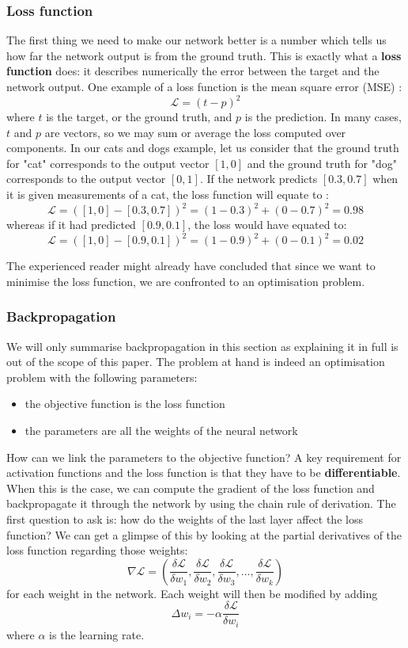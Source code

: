 \subsubsection{Loss function}
The first thing we need to make our network better is a number which tells us
how far the network output is from the ground truth.
This is exactly what a \textbf{loss function}  does: 
it describes numerically the error between the target and the network output.
One example of a loss function is the mean square error (MSE) :
$$ \mathcal{L} = (t-p)^2$$
where $t$ is the target, or the ground truth, and $p$ is the prediction. In
many cases, $t$ and $p$ are vectors, so we may sum or average the loss computed
over components.
In our cats and dogs example, let us consider that the ground truth for
"cat" corresponds to the output vector $[1, 0]$ and the ground truth for "dog"
corresponds to the output vector $[0, 1]$. If the network predicts $[0.3, 0.7]$
when it is given measurements of a cat, the loss function will equate to :
$$ \mathcal{L} = ([1, 0]-[0.3, 0.7])^2 = (1-0.3)^2 + (0-0.7)^2 = 0.98$$
whereas if it had predicted $[0.9, 0.1]$, the loss would have equated to:
$$ \mathcal{L} = ([1, 0]-[0.9, 0.1])^2 = (1-0.9)^2 + (0-0.1)^2 = 0.02$$

The experienced reader might already have concluded that since we want to
minimise the loss function, we are confronted to an optimisation problem.

\subsubsection{Backpropagation}
We will only summarise backpropagation in this section as explaining it in
full is out of the scope of this paper.
The problem at hand is indeed an optimisation problem with the following
parameters:
\begin{itemize}
	\item the objective function is the loss function
	\item the parameters are all the weights of the neural network
\end{itemize}
How can we link the parameters to the objective function? A key requirement
for activation functions and the loss function is that they have to be
\textbf{differentiable}. When this is the case, we can compute the gradient
of the loss function and backpropagate it through the network by using the
chain rule of derivation. The first question to ask is: how do the weights
of the last layer affect the loss function? We can get a glimpse of this
by looking at the partial derivatives of the loss function regarding those
weights:
$$\nabla\mathcal{L} = \left(
  \frac{\delta\mathcal{L}}{\delta w_1}, 
  \frac{\delta\mathcal{L}}{\delta w_2}, 
  \frac{\delta\mathcal{L}}{\delta w_3}, ...,
  \frac{\delta\mathcal{L}}{\delta w_k}\right) 
$$
for each weight in the network. Each weight will then be modified by adding
$$ \Delta w_i = - \alpha \frac{\delta\mathcal{L}}{\delta w_i}$$
where $\alpha$ is the learning rate.\\

